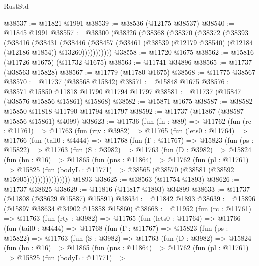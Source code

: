 \begin{lexlean}{RustStd}
\begin{coremodule}
@38537 := @11821 @1991
@38539 := @38536 (@12175 @38537)
@38540 := @11845 @1991
@38557 := @38300
    (@38326
      (@38368
        (@38370
          (@38372
            (@38393
              (@38416
                (@38431
                  (@38446
                    (@38457
                      (@38461 (@38539 (@12179 @38540) (@12184 (@12186 @1854)) @13260)))))))))))
@38558 := @11720 @1675
@38562 := @15816 (@11726 @1675) (@11732 @1675)
@38563 := @11741 @34896
@38565 := @11737 (@38563 @15828)
@38567 := @11779 (@11780 @1675)
@38568 := @11775 @38567
@38570 := @11737 (@38568 @15842)
@38571 := @15848 @1675
@38576 := @38571 @15850 @11818 @11790 @11794 @11797
@38581 := @11737 (@15847 (@38576 @15856 @15861) @15868)
@38582 := @15871 @1675
@38587 := @38582 @15850 @11818 @11790 @11794 @11797
@38592 := @11737 (@11867 (@38587 @15856 @15861) @4099)
@38623 := @11736
    (fun (fn : @89) =>
    @11762
      (fun (rc : @11761) =>
      @11763
        (fun (rty : @3982) =>
        @11765
          (fun (lets0 : @11764) =>
          @11766
            (fun (tail0 : @4444) =>
            @11768
              (fun (Γ : @11767) =>
              @15823
                (fun (ps : @15822) =>
                @11763
                  (fun (S : @3982) =>
                  @11763
                    (fun (D : @3982) =>
                    @15824
                      (fun (hn : @16) =>
                      @11865
                        (fun (pns : @11864) =>
                        @11762
                          (fun (pl : @11761) =>
                          @15825
                            (fun (bodyL : @11771) =>
                            @38565 (@38570 (@38581 (@38592 @15905))))))))))))))))
    @1893
@38625 := @38563 (@11754 @1893)
@38626 := @11737 @38625
@38629 := @11816 (@11817 @1893) @34899
@38633 := @11737 (@11808 (@38629 @15887) @15891)
@38634 := @11842 @1893
@38639 := @15896 (@15897 @38634 @34902 @15858 @15860)
@38668 := @11952
    (fun (rc : @11761) =>
    @11763
      (fun (rty : @3982) =>
      @11765
        (fun (lets0 : @11764) =>
        @11766
          (fun (tail0 : @4444) =>
          @11768
            (fun (Γ : @11767) =>
            @15823
              (fun (ps : @15822) =>
              @11763
                (fun (S : @3982) =>
                @11763
                  (fun (D : @3982) =>
                  @15824
                    (fun (hn : @16) =>
                    @11865
                      (fun (pns : @11864) =>
                      @11762
                        (fun (pl : @11761) =>
                        @15825
                          (fun (bodyL : @11771) =>

\end{coremodule}
\end{lexlean}

